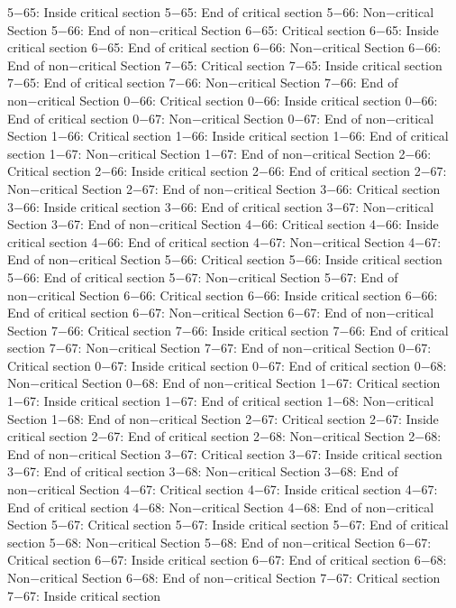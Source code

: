 5−65: Inside critical section
5−65: End of critical section
5−66: Non−critical Section
5−66: End of non−critical Section
6−65: Critical section
6−65: Inside critical section
6−65: End of critical section
6−66: Non−critical Section
6−66: End of non−critical Section
7−65: Critical section
7−65: Inside critical section
7−65: End of critical section
7−66: Non−critical Section
7−66: End of non−critical Section
0−66: Critical section
0−66: Inside critical section
0−66: End of critical section
0−67: Non−critical Section
0−67: End of non−critical Section
1−66: Critical section
1−66: Inside critical section
1−66: End of critical section
1−67: Non−critical Section
1−67: End of non−critical Section
2−66: Critical section
2−66: Inside critical section
2−66: End of critical section
2−67: Non−critical Section
2−67: End of non−critical Section
3−66: Critical section
3−66: Inside critical section
3−66: End of critical section
3−67: Non−critical Section
3−67: End of non−critical Section
4−66: Critical section
4−66: Inside critical section
4−66: End of critical section
4−67: Non−critical Section
4−67: End of non−critical Section
5−66: Critical section
5−66: Inside critical section
5−66: End of critical section
5−67: Non−critical Section
5−67: End of non−critical Section
6−66: Critical section
6−66: Inside critical section
6−66: End of critical section
6−67: Non−critical Section
6−67: End of non−critical Section
7−66: Critical section
7−66: Inside critical section
7−66: End of critical section
7−67: Non−critical Section
7−67: End of non−critical Section
0−67: Critical section
0−67: Inside critical section
0−67: End of critical section
0−68: Non−critical Section
0−68: End of non−critical Section
1−67: Critical section
1−67: Inside critical section
1−67: End of critical section
1−68: Non−critical Section
1−68: End of non−critical Section
2−67: Critical section
2−67: Inside critical section
2−67: End of critical section
2−68: Non−critical Section
2−68: End of non−critical Section
3−67: Critical section
3−67: Inside critical section
3−67: End of critical section
3−68: Non−critical Section
3−68: End of non−critical Section
4−67: Critical section
4−67: Inside critical section
4−67: End of critical section
4−68: Non−critical Section
4−68: End of non−critical Section
5−67: Critical section
5−67: Inside critical section
5−67: End of critical section
5−68: Non−critical Section
5−68: End of non−critical Section
6−67: Critical section
6−67: Inside critical section
6−67: End of critical section
6−68: Non−critical Section
6−68: End of non−critical Section
7−67: Critical section
7−67: Inside critical section
